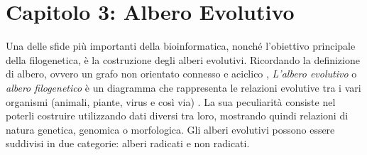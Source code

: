\chapter{Capitolo 3: Albero Evolutivo}
Una delle sfide più importanti della bioinformatica, nonché l'obiettivo principale della filogenetica, è la costruzione degli alberi evolutivi.
\newline
Ricordando la definizione di albero, ovvero un grafo non orientato connesso e aciclico \cite{algoritmiEStruttureDati2}, \textit{L'albero evolutivo} o \textit{albero filogenetico} è un diagramma che rappresenta le relazioni evolutive tra i vari organismi (animali, piante, virus e così via) \cite{buildingaphylogenictree}. La sua peculiarità consiste nel poterli costruire utilizzando dati diversi tra loro, mostrando quindi relazioni di natura genetica, genomica o morfologica.
\newline
Gli alberi evolutivi possono essere suddivisi in due categorie: alberi radicati e non radicati.


